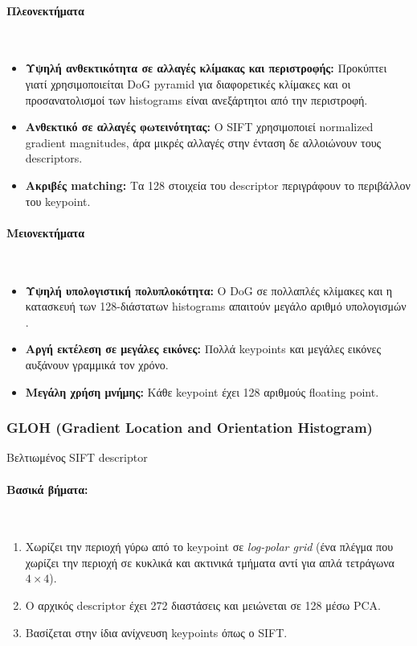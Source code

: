 \documentclass[12pt]{article}
\begin{document}
\paragraph{Πλεονεκτήματα}
\mbox{}\\
\begin{itemize}
  \item \textbf{Υψηλή ανθεκτικότητα σε αλλαγές κλίμακας και περιστροφής:} Προκύπτει γιατί χρησιμοποιείται DoG pyramid για διαφορετικές κλίμακες και οι προσανατολισμοί των histograms είναι ανεξάρτητοι από την περιστροφή.
  \item \textbf{Ανθεκτικό σε αλλαγές φωτεινότητας:} Ο SIFT χρησιμοποιεί normalized gradient magnitudes, άρα μικρές αλλαγές στην ένταση δε αλλοιώνουν τους descriptors.
  \item \textbf{Ακριβές matching:} Τα 128 στοιχεία του descriptor περιγράφουν το περιβάλλον του keypoint.
\end{itemize}


\paragraph{Μειονεκτήματα}
\mbox{}\\
\begin{itemize}
  \item \textbf{Υψηλή υπολογιστική πολυπλοκότητα:} Ο DoG σε πολλαπλές κλίμακες και η κατασκευή των 128-διάστατων histograms απαιτούν μεγάλο αριθμό υπολογισμών . 
  \item \textbf{Αργή εκτέλεση σε μεγάλες εικόνες:} Πολλά keypoints και μεγάλες εικόνες αυξάνουν γραμμικά τον χρόνο.
  \item \textbf{Μεγάλη χρήση μνήμης:} Κάθε keypoint έχει 128 αριθμούς floating point.
\end{itemize}


\subsubsection{GLOH (Gradient Location and Orientation Histogram)}
Βελτιωμένος SIFT descriptor

\paragraph{Βασικά βήματα:}
\mbox{}\\
\begin{enumerate}
  \item Χωρίζει την περιοχή γύρω από το keypoint σε \textit{log-polar grid} (ένα πλέγμα που χωρίζει την περιοχή σε κυκλικά και ακτινικά τμήματα αντί για απλά τετράγωνα $4\times4$).
  \item Ο αρχικός descriptor έχει 272 διαστάσεις και μειώνεται σε 128 μέσω PCA. 
  \item Βασίζεται στην ίδια ανίχνευση keypoints όπως ο SIFT.
\end{enumerate}
\end{document}

